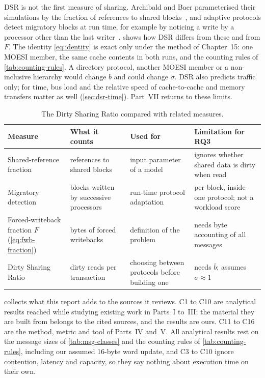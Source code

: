 DSR is not the first measure of sharing. Archibald and Baer parameterised their
simulations by the fraction of references to shared
blocks~\cite[p.~286]{archibald1986evaluation}, and adaptive protocols detect
migratory blocks at run time, for example by noticing a write by a processor other
than the last writer~\cite{stenstrom1993adaptive,nilsson1994adaptive}.
 shows how DSR differs from these and from $F$. The identity
\cref{eq:identity} is exact only under the method of Chapter~15: one MOESI member,
the same cache contents in both runs, and the counting rules of
\cref{tab:counting-rules}. A directory protocol, another MOESI member or a
non-inclusive hierarchy would change $\bar b$ and could change $\sigma$. DSR also
predicts traffic only; for time, bus load and the relative speed of cache-to-cache
and memory transfers matter as well (\cref{sec:dsr-time}). Part~VII returns to
these limits.

\begin{table}[htbp]
\centering
\caption{The Dirty Sharing Ratio compared with related measures.}
\label{tab:dsr-vs}
\small
\begin{tabular}{@{}L{3.1cm} L{3.0cm} L{3.4cm} L{3.4cm}@{}}
\toprule
Measure & What it counts & Used for & Limitation for RQ3 \\
\midrule
Shared-reference fraction~\cite{archibald1986evaluation} & references to
  shared blocks & input parameter of a model & ignores whether shared data is
  dirty when read \\
Migratory detection~\cite{stenstrom1993adaptive,nilsson1994adaptive} & blocks
  written by successive processors & run-time protocol adaptation & per block,
  inside one protocol; not a workload score \\
Forced-writeback fraction $F$ (\cref{eq:fwb-fraction}) & bytes of forced
  writebacks & definition of the problem & needs byte accounting of all
  messages \\
Dirty Sharing Ratio & dirty reads per transaction & choosing between
  protocols before building one & needs $\bar b$; assumes $\sigma \approx 1$ \\
\bottomrule
\end{tabular}
\end{table}

\label{sec:contrib-parts123}
\label{sec:contrib-parts45}
 collects what this report adds to the sources it reviews.
C1 to C10 are analytical results reached while studying existing work in Parts~I
to~III; the material they are built from belongs to the cited sources, and the
results are ours. C11 to C16 are the method, metric and tool of Parts~IV and~V. All
analytical results rest on the message sizes of \cref{tab:msg-classes} and the
counting rules of \cref{tab:counting-rules}, including our assumed 16-byte word
update, and C3 to C10 ignore contention, latency and capacity, so they say nothing
about execution time on their own.

